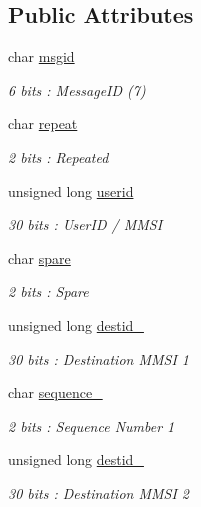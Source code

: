 \subsection*{Public Attributes}
\begin{DoxyCompactItemize}
\item 
char \mbox{\hyperlink{structaismsg__7_a1b6fdd5258467b877e56004e608386ce}{msgid}}
\begin{DoxyCompactList}\small\item\em 6 bits \+: Message\+ID (7) \end{DoxyCompactList}\item 
char \mbox{\hyperlink{structaismsg__7_ab2f3e64200f9ec73a852da149d5ddb9a}{repeat}}
\begin{DoxyCompactList}\small\item\em 2 bits \+: Repeated \end{DoxyCompactList}\item 
unsigned long \mbox{\hyperlink{structaismsg__7_a4473350cfa86bc88c1bf890e6d132e55}{userid}}
\begin{DoxyCompactList}\small\item\em 30 bits \+: User\+ID / M\+M\+SI \end{DoxyCompactList}\item 
char \mbox{\hyperlink{structaismsg__7_a8e41dd90e02216cc683bd1d8000ea71f}{spare}}
\begin{DoxyCompactList}\small\item\em 2 bits \+: Spare \end{DoxyCompactList}\item 
unsigned long \mbox{\hyperlink{structaismsg__7_aa471618b24cce4644dd314bdc197742c}{destid\+\_}}
\begin{DoxyCompactList}\small\item\em 30 bits \+: Destination M\+M\+SI 1 \end{DoxyCompactList}\item 
char \mbox{\hyperlink{structaismsg__7_a970700e972022e922566601ef0c0c7f3}{sequence\+\_}}
\begin{DoxyCompactList}\small\item\em 2 bits \+: Sequence Number 1 \end{DoxyCompactList}\item 
unsigned long \mbox{\hyperlink{structaismsg__7_afab371740e381a118754fd101b736bad}{destid\+\_}}
\begin{DoxyCompactList}\small\item\em 30 bits \+: Destination M\+M\+SI 2 \end{DoxyCompactList}\item 

\end{DoxyCompactItemize}
